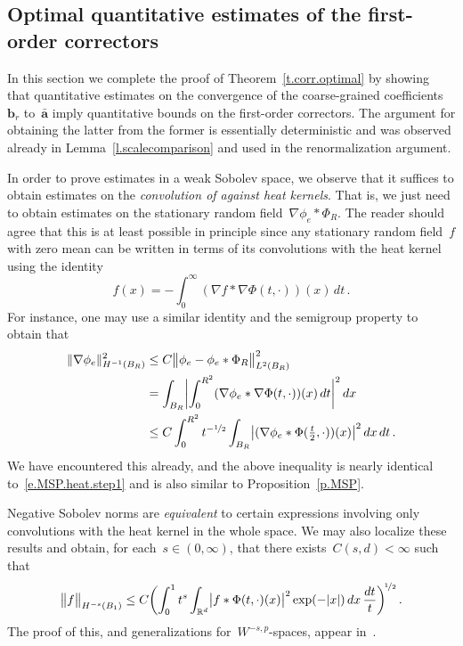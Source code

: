 \documentclass[11pt,twoside]{article} %
\numberwithin{equation}{section}
\theoremstyle{definition}
\newcommand*{\Rd}{\ensuremath{\mathbb{R}^d}}
\renewcommand{\b}{\ensuremath{\mathbf{b}}}
\renewcommand{\a}{\mathbf{a}}
\newcommand{\ahom}{\bar{\a}}
\begin{document}
\subsection{Optimal quantitative estimates of the first-order correctors}
\label{ss.correctors.optimal}

In this section we complete the proof of Theorem~\ref{t.corr.optimal} by showing that quantitative estimates on the convergence of the coarse-grained coefficients~$\b_r$ to~$\ahom$ imply quantitative bounds on the first-order correctors. The argument for obtaining the latter from the former is essentially deterministic and was observed already in Lemma~\ref{l.scalecomparison} and used in the renormalization argument. 

\smallskip

In order to prove estimates in a weak Sobolev space, we observe that it suffices to obtain estimates on the \emph{convolution of against heat kernels}. That is, we just need to obtain estimates on the stationary random field~$\nabla \phi_e \ast \Phi_R$. The reader should agree that this is at least possible in principle since any stationary random field~$f$ with zero mean can be written in terms of its convolutions with the heat kernel using the identity
\begin{equation*}
f(x) = - \int_0^\infty (\nabla f \ast \nabla \Phi(t,\cdot) ) (x) \,dt\,.
\end{equation*}
For instance, one may use a similar identity and the semigroup property to obtain that
\begin{align}
\label{e.multiscale.HK}
\| \nabla \phi_e \|_{H^{-1}(B_R)}^2 
& 
\leq 
C
\bigl\| \phi_e - \phi_e\ast \Phi_R  \bigr\|_{L^2(B_R)}^2 
\notag \\ & 
= 
\int_{B_R} \biggl| 
\int_0^{R^2} (\nabla \phi_e \ast \nabla \Phi(t,\cdot) ) (x) \,dt
\biggr|^2\,dx
\notag \\ & 
\leq 
C\int_0^{R^2} 
t^{-\nicefrac12}
\int_{B_R} 
\bigl| (\nabla \phi_e \ast \Phi(\tfrac t2,\cdot) ) (x) \bigr|^2
\,dx \,dt\,.
\end{align}
We have encountered this already, and the above inequality is nearly identical to~\eqref{e.MSP.heat.step1} and is also similar to Proposition~\ref{p.MSP}. 

\smallskip 

Negative Sobolev norms are \emph{equivalent} to certain expressions involving only convolutions with the heat kernel in the whole space. We may also localize these results and obtain, for each~$s\in (0,\infty)$, that there exists~$C(s,d) <\infty$ such that
\begin{equation}
\label{e.negsob.sint}
\big\| f \bigr\|_{H^{-s}(B_1)} 
\leq C
\biggl( 
\int_0^1 t^{s}  \int_{\Rd}  \bigl| f\ast \Phi(t,\cdot) (x) \bigr|^2 \exp(-|x|) \, dx 
\,\frac{dt}{t} 
\biggr)^{\!\nicefrac12}\,.
\end{equation}
The proof of this, 
and generalizations for~$W^{-s,p}$-spaces, appear in~\cite[Appendix D]{AKMBook}. 
\end{document}
